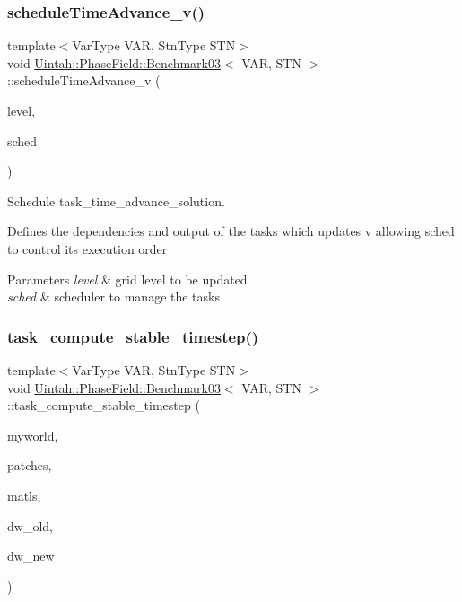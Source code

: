 \subsubsection{\texorpdfstring{schedule\+Time\+Advance\+\_\+v()}{scheduleTimeAdvance\_v()}}
{\footnotesize\ttfamily template$<$Var\+Type V\+AR, Stn\+Type S\+TN$>$ \\
void \hyperlink{classUintah_1_1PhaseField_1_1Benchmark03}{Uintah\+::\+Phase\+Field\+::\+Benchmark03}$<$ V\+AR, S\+TN $>$\+::schedule\+Time\+Advance\+\_\+v (\begin{DoxyParamCaption}\item[{LevelP const \&}]{level,  }\item[{SchedulerP \&}]{sched }\end{DoxyParamCaption})\hspace{0.3cm}{\ttfamily [protected]}}



Schedule task\+\_\+time\+\_\+advance\+\_\+solution. 

Defines the dependencies and output of the tasks which updates v allowing sched to control its execution order


\begin{DoxyParams}{Parameters}
{\em level} & grid level to be updated \\
\hline
{\em sched} & scheduler to manage the tasks \\
\hline
\end{DoxyParams}
\mbox{\label{classUintah_1_1PhaseField_1_1Benchmark03_a7f43fa4a4319add16174dc4446e0efd0}} 
\subsubsection{\texorpdfstring{task\+\_\+compute\+\_\+stable\+\_\+timestep()}{task\_compute\_stable\_timestep()}}
{\footnotesize\ttfamily template$<$Var\+Type V\+AR, Stn\+Type S\+TN$>$ \\
void \hyperlink{classUintah_1_1PhaseField_1_1Benchmark03}{Uintah\+::\+Phase\+Field\+::\+Benchmark03}$<$ V\+AR, S\+TN $>$\+::task\+\_\+compute\+\_\+stable\+\_\+timestep (\begin{DoxyParamCaption}\item[{Processor\+Group const $\ast$}]{myworld,  }\item[{Patch\+Subset const $\ast$}]{patches,  }\item[{Material\+Subset const $\ast$}]{matls,  }\item[{Data\+Warehouse $\ast$}]{dw\+\_\+old,  }\item[{Data\+Warehouse $\ast$}]{dw\+\_\+new }\end{DoxyParamCaption})\hspace{0.3cm}{\ttfamily [protected]}}




